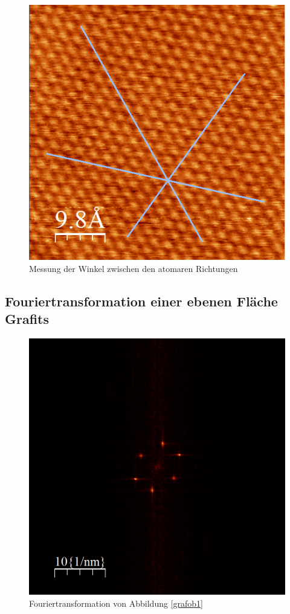 \documentclass[10pt,a4paper]{article}
\begin{document}
\begin{figure}[h]
	\centering
	
	\includegraphics[scale = 0.7]{Winkelmessung_kristall.png}
	
	\caption{Messung der Winkel zwischen den atomaren Richtungen}
	\label{Messungerh6}
\end{figure}

\subsection{Fouriertransformation einer ebenen Fläche Grafits}

\begin{figure}[h]
	\centering
	
	\includegraphics[scale = 0.5]{Fouriertrasformation_kristall.png}
	
	\caption{Fouriertransformation von Abbildung \ref{grafob1}}
	\label{fouriertansformation_ebene}
\end{figure}
\end{document}

